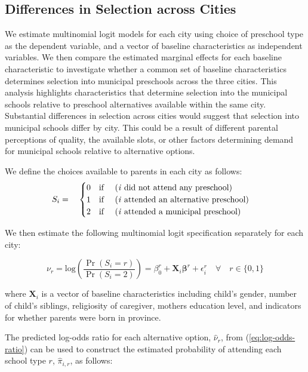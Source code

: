 \subsection{Differences in Selection across Cities}
We estimate multinomial logit models for each city using choice of preschool type as the dependent variable, and a vector of baseline characteristics as independent variables. We then compare the estimated marginal effects for each baseline characteristic to investigate whether a common set of baseline characteristics determines selection into municipal preschools across the three cities. This analysis highlights characteristics that determine selection into the municipal schools relative to preschool alternatives available within the same city. Substantial differences in selection across cities would suggest that selection into municipal schools differ by city. This could be a result of different parental perceptions of quality, the available slots, or other factors determining demand for municipal schools relative to alternative options.

We define the choices available to parents in each city as follows:
\begin{equation}
S_i = \quad
\begin{cases}
0 \quad \text{if \quad (\textit{i} did not attend any preschool)} \\
1 \quad  \text{if \quad (\textit{i} attended an alternative preschool)} \\
2 \quad \text{if \quad (\textit{i} attended a municipal preschool)}  \\
\end{cases}
\end{equation}

\noindent We then estimate the following multinomial logit specification separately for each city:

\begin{equation} \label{eq:log-odds-ratio}
\nu_r = \text{log} \left(\frac{\Pr(S_i=r)}{\Pr(S_i=2)}\right) = \beta_0^r +  \bm{X}_i\bm{\beta}^r + \epsilon_i^r \quad \forall \quad r \in \{0,1\}
\end{equation}

\noindent where $\bm{X}_i$ is a vector of baseline characteristics including child's gender, number of child's siblings, religiosity of caregiver, mothers education level, and indicators for whether parents were born in province.

The predicted log-odds ratio for each alternative option, $\hat{\nu}_r$, from (\ref{eq:log-odds-ratio}) can be used to construct the estimated probability of attending each school type $r$, $\hat{\pi}_{i,r}$, as follows:

